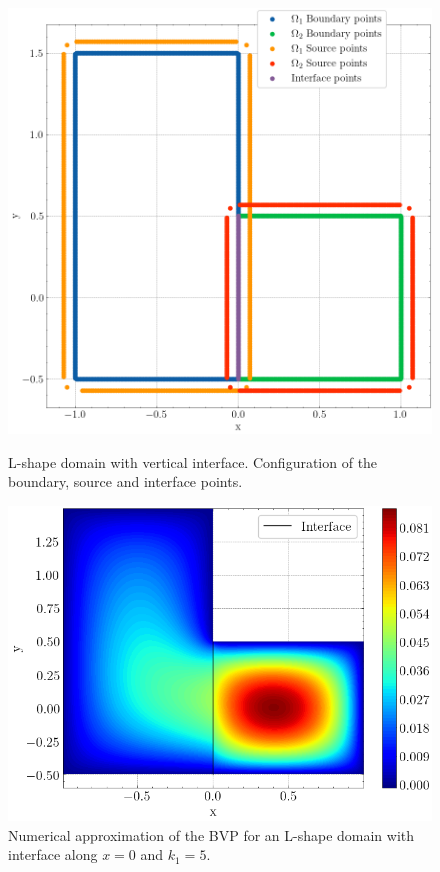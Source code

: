 \begin{figure}[!htb]
    \centering
    \begin{minipage}{.5\textwidth}
        \centering
        \includegraphics[width=0.8\linewidth]{Images/Transmission/L_shape_2_rectangles_col_points.png}
        \captionsetup{width=0.9\linewidth} %
        \caption{L-shape domain with vertical interface. Configuration of the boundary, source and interface points.}
        \label{transmission_L_shape_config}
    \end{minipage}%
    \begin{minipage}{.5\textwidth}
        \centering
        \includegraphics[width=\linewidth]{Images/Transmission/L_shape_2_rectangles_k1_5.png}
        \captionsetup{width=0.9\linewidth} %
        \caption{Numerical approximation of the \ac{BVP} for an L-shape domain with interface along \(x=0\) and \(k_1=5\).}
        \label{transmission_L_shape_k1_5}
    \end{minipage}
\end{figure}

